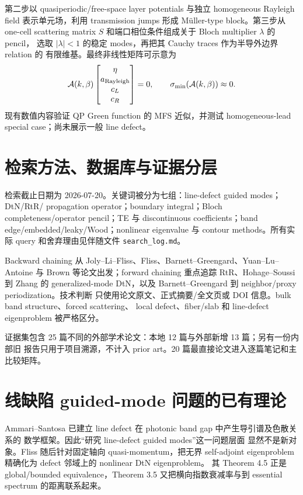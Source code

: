 \documentclass[UTF8,11pt,fontset=none]{ctexart}
\begin{document}
第二步以 quasiperiodic/free-space layer potentials 与独立 homogeneous Rayleigh field
表示单元场，利用 transmission jumps 形成 Müller-type block。第三步从 one-cell
scattering matrix \(S\) 和端口相位条件组成关于 Bloch multiplier \(\lambda\) 的 pencil，
选取 \(|\lambda|<1\) 的稳定 modes，再把其 Cauchy traces 作为半导外边界 relation 的
有限维基。最终非线性矩阵可示意为
\begin{equation}
  \mathcal A(k,\beta)
  \begin{bmatrix}\eta\\a_{\rm Rayleigh}\\c_L\\c_R\end{bmatrix}=0,
  \qquad
  \sigma_{\min}(\mathcal A(k,\beta))\approx0.
\end{equation}
现有数值内容验证 QP Green function 的 MFS 近似，并测试 homogeneous-lead special
case；尚未展示一般 line defect。

\section{检索方法、数据库与证据分层}

检索截止日期为 2026-07-20。关键词被分为七组：line-defect guided modes；DtN/RtR/
propagation operator；boundary integral；Bloch completeness/operator pencil；TE 与
discontinuous coefficients；band edge/embedded/leaky/Wood；nonlinear eigenvalue 与
contour methods。所有实际 query 和舍弃理由见伴随文件 \texttt{search\_log.md}。

Backward chaining 从 Joly--Li--Fliss、Fliss、Barnett--Greengard、Yuan--Lu--Antoine
与 Brown 等论文出发；forward chaining 重点追踪 RtR、Hohage--Soussi 到 Zhang 的
generalized-mode DtN，以及 Barnett--Greengard 到 neighbor/proxy periodization。技术判断
只使用论文原文、正式摘要/全文页或 DOI 信息。bulk band structure、forced scattering、
local defect、fiber/slab 和 line-defect eigenproblem 被严格区分。

证据集包含 25 篇不同的外部学术论文：本地 12 篇与外部新增 13 篇；另有一份内部旧
报告只用于项目溯源，不计入 prior art。20 篇最直接论文进入逐篇笔记和主比较矩阵。

\section{线缺陷 guided-mode 问题的已有理论}

Ammari--Santosa 已建立 line defect 在 photonic band gap 中产生导引谱及色散关系的
数学框架\cite{AmmariSantosa2004}。因此“研究 line-defect guided modes”这一问题层面
显然不是新对象。Fliss 随后针对固定轴向 quasi-momentum，把无界 self-adjoint
eigenproblem 精确化为 defect 邻域上的 nonlinear DtN eigenproblem\cite{Fliss2013}。
其 Theorem 4.5 正是 global/bounded equivalence，Theorem 3.5 又把横向指数衰减率与到
essential spectrum 的距离联系起来。
\end{document}
